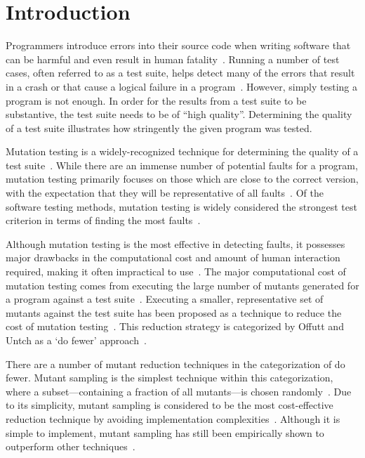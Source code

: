 
\section{Introduction}

Programmers introduce errors into their source code when writing software
that can be harmful and even result in human fatality~\cite{vicente2003programming}.
Running a number of test cases, often referred to as a test suite, helps detect many of the errors
that result in a crash or that cause a logical failure in a program~\cite{wagner2005comparing}.
However, simply testing a program is not enough. In order for the results
from a test suite to be substantive, the test suite needs to be of ``high quality''.
Determining the quality of a test suite illustrates how stringently the given
program was tested.

Mutation testing is a widely-recognized technique for determining the quality
of a test suite~\cite{gopinath2015mutation}. While there are an immense number
of potential faults for a program, mutation testing primarily focuses on those
which are close to the correct version, with the expectation that they will
be representative of all faults~\cite{jia2011analysis}.
Of the software testing methods, mutation testing is widely considered the strongest
test criterion in terms of finding the most faults~\cite{ammann2008introduction}.

Although mutation testing is the most effective in detecting faults, it possesses
major drawbacks in the computational cost and amount of human interaction required, making it
often impractical to use~\cite{gopinath2015mutation, wong1995reducing, gopinath2015empirical}.
The major computational cost of mutation testing comes from executing the large number of mutants generated for a
program against a test suite~\cite{offutt1993experimental}. Executing a smaller, representative
set of mutants against the test suite has been proposed as a technique to reduce
the cost of mutation testing~\cite{jia2011analysis, wong1995reducing, offutt1993experimental, offutt2001mutation}.
This reduction strategy is categorized by Offutt and Untch as a `do fewer' approach~\cite{offutt2001mutation}.

There are a number of mutant reduction techniques in the categorization of do fewer.
Mutant sampling is the simplest technique within this categorization, where a
subset---containing a fraction of all mutants---is chosen randomly~\cite{wong1995reducing}.
Due to its simplicity, mutant sampling is considered to be the most cost-effective
reduction technique by avoiding implementation complexities~\cite{gopinath2015mutation}.
Although it is simple to implement, mutant sampling has still been empirically shown
to outperform other techniques~\cite{zhang2010operator}.

